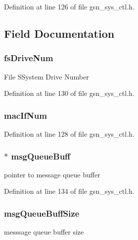Definition at line 126 of file gsn\_\-sys\_\-ctl.h.



\subsection{Field Documentation}
\hypertarget{a00249_a608e9ec21e3e188328d47a7bba1483ec}{
\subsubsection[{fsDriveNum}]{ {\bf fsDriveNum}}}
\label{a00249_a608e9ec21e3e188328d47a7bba1483ec}
File SSystem Drive Number 

Definition at line 130 of file gsn\_\-sys\_\-ctl.h.

\hypertarget{a00249_ae57ae92e651751e7978e237c55133b4c}{
\subsubsection[{macIfNum}]{ {\bf macIfNum}}}
\label{a00249_ae57ae92e651751e7978e237c55133b4c}


Definition at line 128 of file gsn\_\-sys\_\-ctl.h.

\hypertarget{a00249_a7e51f5f5131592004e739bcc100a27fc}{
\subsubsection[{msgQueueBuff}]{$\ast$ {\bf msgQueueBuff}}}
\label{a00249_a7e51f5f5131592004e739bcc100a27fc}
pointer to message queue buffer 

Definition at line 134 of file gsn\_\-sys\_\-ctl.h.

\hypertarget{a00249_a21640f5a1df0caa651f4ffe4280d6210}{
\subsubsection[{msgQueueBuffSize}]{ {\bf msgQueueBuffSize}}}
\label{a00249_a21640f5a1df0caa651f4ffe4280d6210}
messsage queue buffer size 

